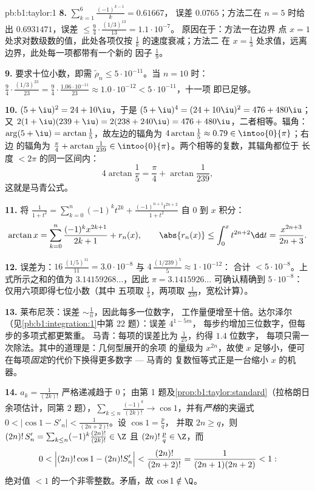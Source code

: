\begin{solution}{pb:b1:taylor:1}
\textbf{8.} $\sum_{k=1}^{6}\frac{(-1)^{k-1}}{k} = 0.61667$，
误差 $0.0765$；方法二在 $n = 5$ 时给出 $0.6931471$，误差
$\leq \frac94\cdot\frac{(1/3)^{13}}{13} = 1.1\cdot10^{-7}$。
原因在于：方法一在边界
点 $x = 1$ 处求对数级数的值，此处各项仅按 $\frac1k$ 的速度衰减；方法二
在 $x = \frac13$ 处求值，远离边界，此处每一项都带有一个新的
因子 $\frac19$。

\textbf{9.} 要求十位小数，即需 $\tilde\rho_n \leq
5\cdot10^{-11}$。当 $n = 10$ 时：$\frac94 \cdot
\frac{(1/3)^{23}}{23} = \frac94\cdot\frac{1.06\cdot10^{-11}}{23}
\approx 1.0\cdot10^{-12} < 5\cdot10^{-11}$，十一项
即已足够。

\textbf{10.} $(5+\iu)^2 = 24 + 10\iu$，于是 $(5+\iu)^4 = (24 +
10\iu)^2 = 476 + 480\iu$；又 $2(1+\iu)(239+\iu) = 2(238 +
240\iu) = 476 + 480\iu$，二者相等。辐角：$\arg(5 + \iu) =
\arctan\frac15$，故左边的辐角为
$4\arctan\frac15 \approx 0.79 \in \intoo{0}{\pi}$；右边
的辐角为 $\frac\pi4 + \arctan\frac{1}{239} \in
\intoo{0}{\pi}$。两个相等的复数，其辐角都位于
长度 $< 2\pi$ 的同一区间内：
\[
4\arctan\frac15 = \frac\pi4 + \arctan\frac{1}{239} ,
\]
这就是马青公式。

\textbf{11.} 将 $\frac{1}{1+t^2} = \sum_{k=0}^n (-1)^k
t^{2k} + \frac{(-1)^{n+1}t^{2n+2}}{1+t^2}$ 自 $0$ 到 $x$ 积分：
\[
\arctan x = \sum_{k=0}^{n}\frac{(-1)^k x^{2k+1}}{2k+1} +
r_n(x),
\qquad
\abs{r_n(x)} \leq \int_0^x t^{2n+2}\dd t =
\frac{x^{2n+3}}{2n+3} .
\]

\textbf{12.} 误差为：$16\,\frac{(1/5)^{11}}{11} = 3.0\cdot
10^{-8}$ 与 $4\,\frac{(1/239)^5}{5} \approx 1\cdot10^{-12}$：
合计 $< 5\cdot10^{-8}$。上式所示之和的值为
$3.14159268\dots$，因此 $\pi = 3.1415926\dots$ 可确认精确到
$5\cdot10^{-8}$：仅用六项即得七位小数（其中
五项取 $\frac15$，两项取 $\frac1{239}$，宽松计算）。

\textbf{13.} 莱布尼茨：误差 $\sim \frac1n$，因此每多一位数字，
工作量便增至十倍。达尔泽尔
（见\cref{pb:b1:integration:1}中第 22 题）：误差 $4^{1-5m}$，
每步约增加三位数字，但每步的多项式都更繁重。
马青：每项的误差比为 $\frac{1}{25}$，约得 $1.4$ 位数字，
每项只需一次除法。其中的道理是：几何型展开的余项
的量级为 $x^{2n}$，故使 $x$
足够小，便可在每项\emph{固定}的代价下换得更多数字 --- 马青的
复数恒等式正是一台缩小 $x$ 的机器。

\textbf{14.} $a_k = \frac{1}{(2k)!}$ 严格递减趋于 $0$；
由第 1 题及\cref{prop:b1:taylor:standard}（拉格朗日
余项估计，同第 2 题），$\sum_{k \leq n}\frac{(-1)^k}{(2k)!}
\to \cos 1$，并有\emph{严格}的夹逼式 $0 < \bigl|\cos 1 -
S'_n\bigr| < \frac{1}{(2n+2)!}$。设 $\cos 1 = \frac pq$，
并取 $2n \geq q$，则 $(2n)!\,S'_n = \sum_{k\leq n} (-1)^k
\frac{(2n)!}{(2k)!} \in \Z$ 且 $(2n)!\,\frac pq \in \Z$，而
\[
0 < \Bigl|(2n)!\cos 1 - (2n)!S'_n\Bigr| <
\frac{(2n)!}{(2n+2)!} = \frac{1}{(2n+1)(2n+2)} < 1 :
\]
绝对值 $< 1$ 的一个非零整数。矛盾，故 $\cos
1 \notin \Q$。


\end{solution}
